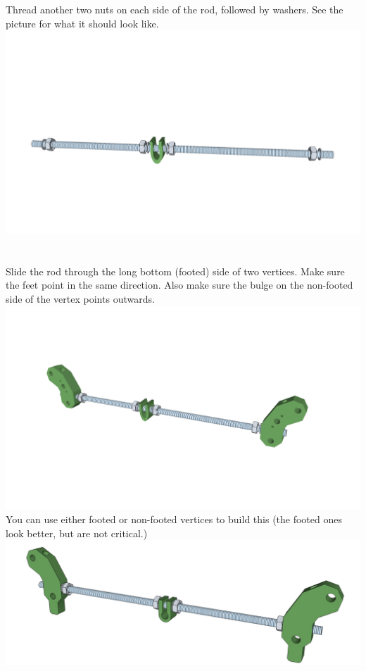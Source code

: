\documentclass[twoside,a4paper,titlepage]{memoir}
\begin{document}
	\section{}
	Thread another two nuts on each side of the rod, followed by washers. See the picture for what it
	should look like. \\
	\includegraphics[width=1\linewidth]{graphics/ch1_5.png}
	
	\section{}
	Slide the rod through the long bottom (footed) side of two vertices. Make sure the feet point in the same
	direction. Also make sure the bulge on the non-footed side of the vertex points
	outwards. \\
	\includegraphics[width=1\linewidth]{graphics/ch1_6_1.png} \\
	You can use either footed or non-footed vertices to build this (the footed ones
	look better, but are not critical.) \\
	\includegraphics[width=1\linewidth]{graphics/ch1_6_2.png}
	
\end{document}
